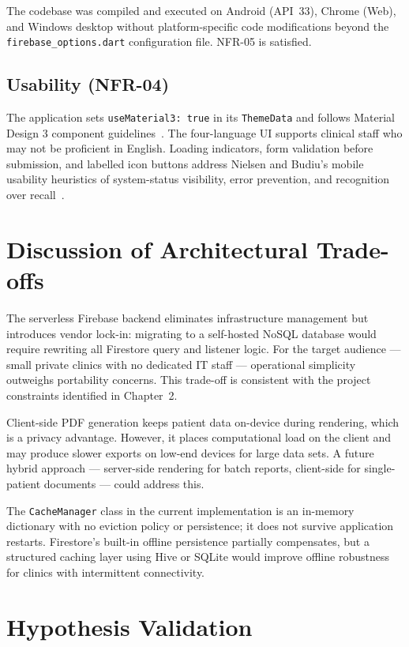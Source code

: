 \documentclass[12pt,a4paper,oneside]{report}
\begin{document}
The codebase was compiled and executed on Android (API~33), Chrome (Web), and
Windows desktop without platform-specific code modifications beyond the
\texttt{firebase\_options.dart} configuration file. NFR-05 is satisfied.

\subsection{Usability (NFR-04)}

The application sets \texttt{useMaterial3: true} in its \texttt{ThemeData} and
follows Material Design 3 component guidelines~\cite{material2024}. The
four-language UI supports clinical staff who may not be proficient in English.
Loading indicators, form validation before submission, and labelled icon buttons
address Nielsen and Budiu's mobile usability heuristics of system-status
visibility, error prevention, and recognition over recall~\cite{nielsen2020}.

\section{Discussion of Architectural Trade-offs}

The serverless Firebase backend eliminates infrastructure management but
introduces vendor lock-in: migrating to a self-hosted NoSQL database would
require rewriting all Firestore query and listener logic. For the target
audience --- small private clinics with no dedicated IT staff --- operational
simplicity outweighs portability concerns. This trade-off is consistent with the
project constraints identified in Chapter~2.

Client-side PDF generation keeps patient data on-device during rendering, which
is a privacy advantage. However, it places computational load on the client and
may produce slower exports on low-end devices for large data sets. A future
hybrid approach --- server-side rendering for batch reports, client-side for
single-patient documents --- could address this.

The \texttt{CacheManager} class in the current implementation is an in-memory
dictionary with no eviction policy or persistence; it does not survive
application restarts. Firestore's built-in offline persistence partially
compensates, but a structured caching layer using Hive or SQLite would improve
offline robustness for clinics with intermittent connectivity.

\section{Hypothesis Validation}
\end{document}
